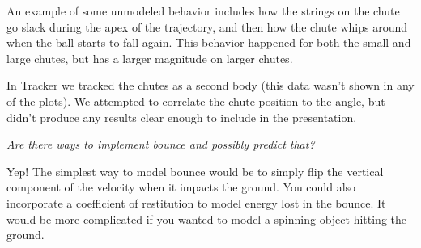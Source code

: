 An example of some unmodeled behavior includes how the strings on the chute go slack during the apex of the trajectory, and then how the chute whips around when the ball starts to fall again. This behavior happened for both the small and large chutes, but has a larger magnitude on larger chutes. 

In Tracker we tracked the chutes as a second body (this data wasn't shown in any of the plots). We attempted to correlate the chute position to the angle, but didn't produce any results clear enough to include in the presentation. 

\medskip 

\textit{Are there ways to implement bounce and possibly predict that?}

\smallskip

Yep! The simplest way to model bounce would be to simply flip the vertical component of the velocity when it impacts the ground. You could also incorporate a coefficient of restitution to model energy lost in the bounce. It would be more complicated if you wanted to model a spinning object hitting the ground. 
